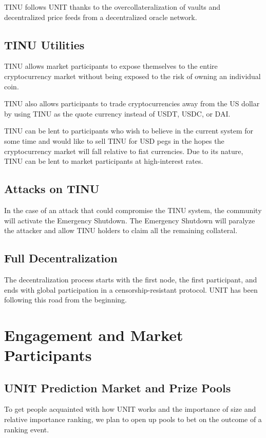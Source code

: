 \documentclass[12pt]{article}
\begin{document}
TINU follows UNIT thanks to the overcollateralization of vaults and decentralized price feeds from a decentralized oracle network.

\subsection{TINU Utilities}

TINU allows market participants to expose themselves to the entire cryptocurrency market without being exposed to the risk of owning an individual coin. 

TINU also allows participants to trade cryptocurrencies away from the US dollar by using TINU as the quote currency instead of USDT, USDC, or DAI.

TINU can be lent to participants who wish to believe in the current system for some time and would like to sell TINU for USD pegs in the hopes the cryptocurrency market will fall relative to fiat currencies. Due to its nature, TINU can be lent to market participants at high-interest rates. 


\subsection{Attacks on TINU}

In the case of an attack that could compromise the TINU system, the community will activate the Emergency Shutdown. The Emergency Shutdown will paralyze the attacker and allow TINU holders to claim all the remaining collateral.

\subsection{Full Decentralization}

The decentralization process starts with the first node, the first participant, and ends with global participation in a censorship-resistant protocol. UNIT has been following this road from the beginning.

\section{Engagement and Market Participants}

\subsection{UNIT Prediction Market and Prize Pools}

To get people acquainted with how UNIT works and the importance of size and relative importance ranking, we plan to open up pools to bet on the outcome of a ranking event.
\end{document}
